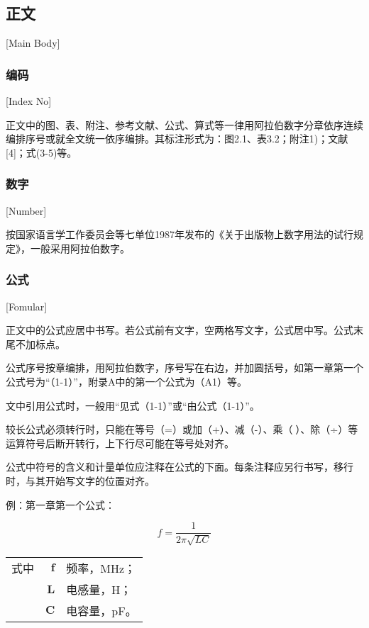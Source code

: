 \subsection{正文}[Main Body]


\subsubsection{编码}[Index No]

正文中的图、表、附注、参考文献、公式、算式等一律用阿拉伯数字分章依序连续编排序号或就全文统一依序编排。其标注形式为：图2.1、表3.2；附注1)；文献[4]；式(3-5)等。

\subsubsection{数字}[Number]

按国家语言学工作委员会等七单位1987年发布的《关于出版物上数字用法的试行规定》，一般采用阿拉伯数字。

\subsubsection{公式}[Fomular]

正文中的公式应居中书写。若公式前有文字，空两格写文字，公式居中写。公式末尾不加标点。

公式序号按章编排，用阿拉伯数字，序号写在右边，并加圆括号，如第一章第一个公式号为“（1-1）”，附录A中的第一个公式为（A1）等。

文中引用公式时，一般用“见式（1-1）”或“由公式（1-1）”。

较长公式必须转行时，只能在等号（=）或加（+）、减（-）、乘（）、除（÷）等运算符号后断开转行，上下行尽可能在等号处对齐。

公式中符号的含义和计量单位应注释在公式的下面。每条注释应另行书写，移行时，与其开始写文字的位置对齐。

例：第一章第一个公式：

\begin{equation}\label{form2x1}
  f=\frac{1}{2\pi\sqrt{LC}}
\end{equation}

\begin{tabularx}{\textwidth}{@{}l@{\quad}r@{——}X@{}}
式中 & $\boldsymbol{f}$    & 频率，MHz； \\
	 & $\boldsymbol{L}$    & 电感量，H；  \\
 	 & $\mathbf{C}$        & 电容量，pF。                       
\end{tabularx}\vspace{3.15bp}

